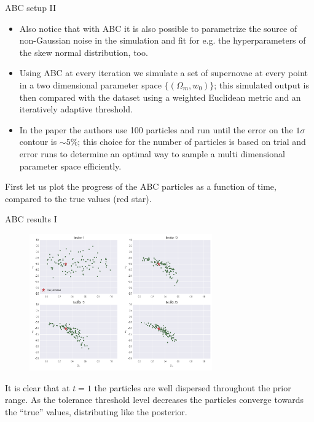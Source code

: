 \documentclass{beamer}
\theoremstyle{remark}
\newcommand{\nologo}{\setbeamertemplate{logo}{}} %
\begin{document}
\begin{frame}{ABC setup II}
\begin{itemize}[<+->]
    \item Also notice that with ABC it is also possible to parametrize the source of non-Gaussian noise in the simulation and fit for e.g. the hyperparameters of the skew normal distribution, too.
    \item Using ABC at every iteration we simulate a set of supernovae at every point in a two dimensional parameter space $\{(\Omega_m, w_0)\}$; this simulated output is then compared with the dataset using a weighted Euclidean metric and an iteratively adaptive threshold.
    \item In the paper the authors use 100 particles and run until the error on the $1\sigma$ contour is $\sim 5\%$; this choice for the number of particles is based on trial and error runs to determine an optimal way to sample a multi dimensional parameter space efficiently.
\end{itemize}
\pause[\thebeamerpauses]
First let us plot the progress of the ABC particles as a function of time, compared to the true values (red star).
\end{frame}

{\nologo
\begin{frame}{ABC results I}
\begin{figure}[H]
    \centering
    \includegraphics[width=0.7\textwidth]{astroabc_abc_results_1.png}
\end{figure}
It is clear that at $t=1$ the particles are well dispersed throughout the prior range. As the tolerance
threshold level decreases the particles converge towards the ``true'' values, distributing like the posterior.
\end{frame}
}
\end{document}
